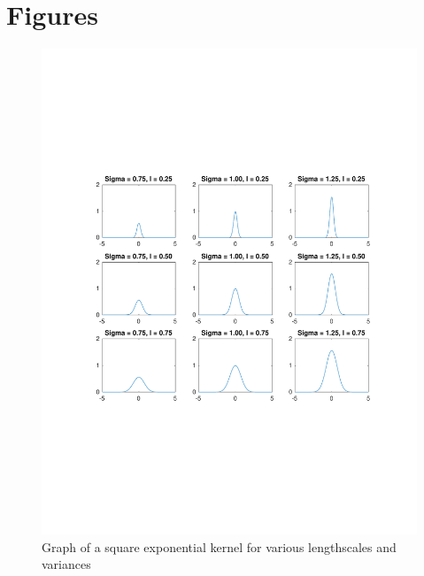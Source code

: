 \documentclass{article}
\begin{document}
\section{Figures}
\begin{figure}[H]
  \centering
  \caption{Graph of a square exponential kernel for various lengthscales and variances}
  \label{fig:square_exp_kernel}
  \includegraphics[trim={0 7cm 0 7cm},clip,keepaspectratio=true,scale=0.5]{square_exp_kernel}
\end{figure}
\end{document}
